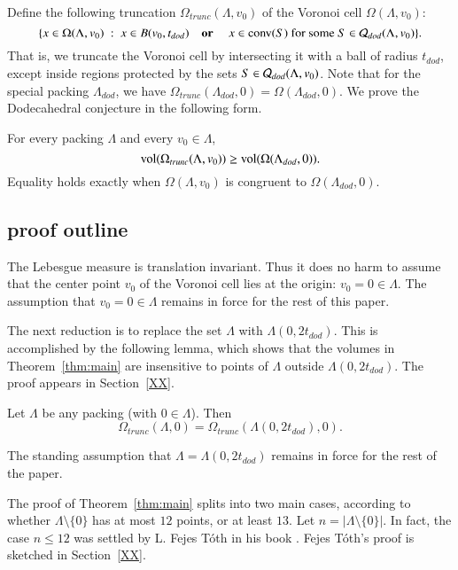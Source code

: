 Define the following truncation $\Omega_{trunc}(\Lambda,v_0)$ 
of the Voronoi cell $\Omega(\Lambda,v_0)$:
   $$
   \{x \in \Omega(\Lambda,v_0) \ :\    x\in B(v_0,t_{dod}) \quad\text{\bf  or }\quad x \in {\operatorname{conv}}(S)
     \text{ for some } S\in {\mathcal Q}_{dod}(\Lambda,v_0) \}. 
   $$
That is, we truncate the Voronoi cell by intersecting it with a ball of radius $t_{dod}$,
except inside regions protected by the sets $S\in{\mathcal Q}_{dod}(\Lambda,v_0)$.
Note that for the special packing $\Lambda_{dod}$, we have 
$\Omega_{trunc}(\Lambda_{dod},0) = \Omega(\Lambda_{dod},0)$.
We prove the  Dodecahedral conjecture in the following form.

\begin{theorem}\label{thm:main}
For every packing $\Lambda$ and every $v_0\in\Lambda$,
   $$
   {\operatorname{vol}}(\Omega_{trunc}(\Lambda,v_0))\ge {\operatorname{vol}}(\Omega(\Lambda_{dod},0)).
   $$
Equality holds exactly when $\Omega(\Lambda,v_0)$ is congruent to
$\Omega(\Lambda_{dod},0)$.
\end{theorem}





\subsection{proof outline}

The Lebesgue measure is translation invariant.  Thus it does no
harm to assume that the center point $v_0$ of the Voronoi cell
lies at the origin: $v_0 = 0 \in \Lambda$.  The assumption that
$v_0=0 \in\Lambda$ remains in force for the rest of this paper.


The next reduction is to replace the set $\Lambda$ with $\Lambda(0,2t_{dod})$.
This is accomplished by the following lemma, which shows that the
volumes in Theorem~\ref{thm:main} are insensitive to points of $\Lambda$
outside $\Lambda(0,2t_{dod})$.  The proof appears in Section~\ref{XX}.


\begin{lemma} Let $\Lambda$ be any packing (with $0\in \Lambda$).
Then
$$\Omega_{trunc}(\Lambda,0) = \Omega_{trunc}(\Lambda(0,2t_{dod}),0).$$
\end{lemma}

The standing assumption that $\Lambda=\Lambda(0,2t_{dod})$ remains in force
for the rest of the paper.

The proof of Theorem~\ref{thm:main}
splits into two main cases, according to whether
$\Lambda\setminus\{0\}$ has at most $12$ points, or at least $13$.
Let $n=|\Lambda\setminus\{0\}|$.  In fact, the case $n\le 12$ was
settled by L. Fejes T\'oth in his book \cite{Toth2}.  Fejes T\'oth's proof
is sketched in Section~\ref{XX}.

